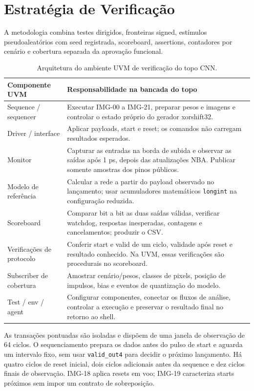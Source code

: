 \documentclass[12pt,a4paper]{article}
\begin{document}
\section{Estratégia de Verificação}
A metodologia combina testes dirigidos, fronteiras signed, estímulos pseudoaleatórios com seed registrada, scoreboard, assertions, contadores por cenário e cobertura separada da aprovação funcional.

\begin{table}[H]\centering\small
\begin{tabularx}{\textwidth}{p{5cm}X}\toprule
\textbf{Componente UVM} & \textbf{Responsabilidade na bancada do topo}\\\midrule
Sequence / sequencer & Executar IMG-00 a IMG-21, preparar pesos e imagens e controlar o estado próprio do gerador xorshift32.\\
Driver / interface & Aplicar payloads, start e reset; os comandos não carregam resultados esperados.\\
Monitor & Capturar as entradas na borda de subida e observar as saídas após 1 ps, depois das atualizações NBA. Publicar somente amostras dos pinos públicos.\\
Modelo de referência & Calcular a rede a partir do payload observado no lançamento; usar acumuladores matemáticos \texttt{longint} na configuração reduzida.\\
Scoreboard & Comparar bit a bit as duas saídas válidas, verificar watchdog, respostas inesperadas, contagens e cancelamentos; produzir o CSV.\\
Verificações de protocolo & Conferir start e valid de um ciclo, validade após reset e resultado conhecido. Na UVM, essas verificações são procedurais no scoreboard.\\
Subscriber de cobertura & Amostrar cenário/pesos, classes de pixels, posição de impulsos, bias e eventos de quantização do modelo.\\
Test / env / agent & Configurar componentes, conectar os fluxos de análise, controlar a execução e preservar o resultado final no retorno ao shell.\\\bottomrule
\end{tabularx}
\caption{Arquitetura do ambiente UVM de verificação do topo CNN.}
\end{table}

As transações pontuadas são isoladas e dispõem de uma janela de observação de 64 ciclos. O sequenciamento prepara os dados antes do pulso de start e aguarda um intervalo fixo, sem usar \texttt{valid\_out4} para decidir o próximo lançamento. Há quatro ciclos de reset inicial, dois ciclos adicionais antes da sequence e dez ciclos finais de observação. IMG-18 aplica resets em voo; IMG-19 caracteriza starts próximos sem impor um contrato de sobreposição.
\end{document}
